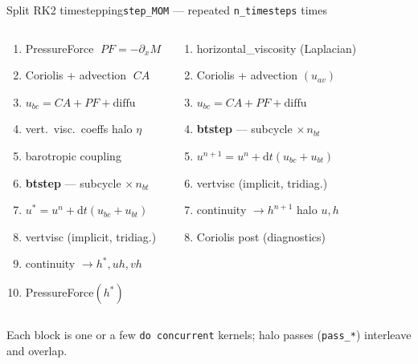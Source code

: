 \documentclass[aspectratio=169]{beamer}
\newcommand{\cplx}[1]{{\footnotesize\color{cookieMuted}#1}}
\begin{document}
\begin{frame}{Split RK2 timestepping}{\texttt{step\_MOM} --- repeated \texttt{n\_timesteps} times}
  \vspace{-2mm}
  \begin{columns}[T,onlytextwidth]
      \begin{cookiecard}[title=Predictor (build accel.\ at $n$)]
        \footnotesize
        \begin{enumerate}\setlength\itemsep{1pt}
          \item PressureForce $\;PF=-\partial_x M$
          \item Coriolis + advection $\;CA$
          \item $u_{bc}=CA+PF+\mathrm{diffu}$
          \item vert.\ visc.\ coeffs \hfill\cplx{halo $\eta$}
          \item barotropic coupling
          \item \textbf{btstep} --- subcycle $\times\,n_{bt}$
          \item $u^{*}=u^{n}+\mathrm{d}t(u_{bc}+u_{bt})$
          \item vertvisc (implicit, tridiag.)
          \item continuity $\to h^{*},uh,vh$
          \item PressureForce$(h^{*})$
        \end{enumerate}
      \end{cookiecard}
      \begin{cookiecard}[title=Corrector (take the step)]
        \footnotesize
        \begin{enumerate}\setlength\itemsep{1pt}\setcounter{enumi}{10}
          \item horizontal\_viscosity (Laplacian)
          \item Coriolis + advection $(u_{av})$
          \item $u_{bc}=CA+PF+\mathrm{diffu}$
          \item \textbf{btstep} --- subcycle $\times\,n_{bt}$
          \item $u^{n+1}=u^{n}+\mathrm{d}t(u_{bc}+u_{bt})$
          \item vertvisc (implicit, tridiag.)
          \item continuity $\to h^{n+1}$ \hfill\cplx{halo $u,h$}
          \item Coriolis post (diagnostics)
        \end{enumerate}
      \end{cookiecard}
  \end{columns}
  \vspace{.1em}

  {\footnotesize Each block is one or a few \texttt{do concurrent} kernels; halo passes (\texttt{pass\_*}) interleave and overlap.}
\end{frame}
\end{document}
